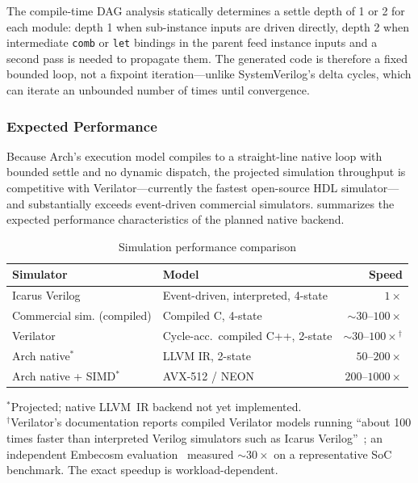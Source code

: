 \documentclass[manuscript]{acmart}
\begin{document}
The compile-time DAG analysis statically determines a settle depth of 1 or 2 for each module: depth 1 when sub-instance inputs are driven directly, depth 2 when intermediate \texttt{comb} or \texttt{let} bindings in the parent feed instance inputs and a second pass is needed to propagate them. The generated code is therefore a fixed bounded loop, not a fixpoint iteration---unlike SystemVerilog's delta cycles, which can iterate an unbounded number of times until convergence.

\subsubsection{Expected Performance}

Because Arch's execution model compiles to a straight-line native loop with bounded settle and no dynamic dispatch, the projected simulation throughput is competitive with Verilator---currently the fastest open-source HDL simulator---and substantially exceeds event-driven commercial simulators.  summarizes the expected performance characteristics of the planned native backend.

\begin{table}[H]
\centering
\caption{Simulation performance comparison}
\label{tab:perf}
\footnotesize
\begin{tabular}{@{}llr@{}}
\toprule
\textbf{Simulator} & \textbf{Model} & \textbf{Speed} \\
\midrule
Icarus Verilog~\cite{icarus} & Event-driven, interpreted, 4-state & $1\times$ \\
Commercial sim. (compiled) & Compiled C, 4-state & ${\sim}30$--$100\times$ \\
Verilator~\cite{verilator} & Cycle-acc.\ compiled C++, 2-state & ${\sim}30$--$100\times$$^\dagger$ \\
Arch native$^\ast$ & LLVM IR, 2-state & $50$--$200\times$ \\
Arch native + SIMD$^\ast$ & AVX-512 / NEON & $200$--$1000\times$ \\
\bottomrule
\end{tabular}

\vspace{0.4em}
\raggedright\footnotesize
$^\ast$Projected; native LLVM~IR backend not yet implemented.\\
$^\dagger$Verilator's documentation reports compiled Verilator models running ``about 100 times faster than interpreted Verilog simulators such as Icarus Verilog''~\cite{verilator}; an independent Embecosm evaluation~\cite{embecosm2013} measured ${\sim}30\times$ on a representative SoC benchmark. The exact speedup is workload-dependent.
\end{table}
\end{document}
